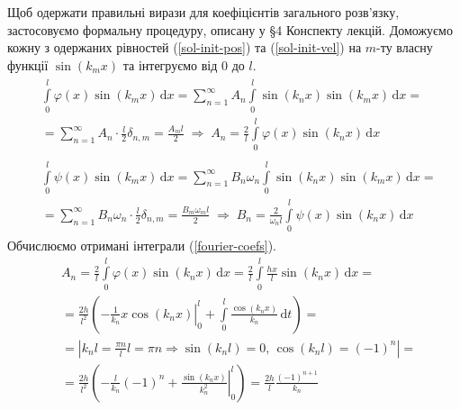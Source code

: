 Щоб одержати правильні вирази для коефіцієнтів загального розв'язку, застосовуємо формальну процедуру, описану у §4 Конспекту лекцій. Доможуємо кожну з одержаних рівностей (\ref{sol-init-pos}) та (\ref{sol-init-vel}) на $m$-ту власну функції $\sin(k_m x)$ та інтегруємо від $0$ до $l$. 
\begin{subequations} \label{fourier-coefs}
    \begin{gather}
        \begin{aligned}
            &\int\limits_0^l \varphi(x) \sin(k_m x) \,\mathrm{d}x = \sum^{\infty}_{n=1} A_n \int\limits_0^l \sin(k_n x) \sin(k_m x) \,\mathrm{d}x =\\
            &= \sum^{\infty}_{n=1} A_n \cdot \frac{l}{2} \delta_{n,m} = \frac{A_m l}{2}
            \;\Rightarrow\;
            A_n = \frac{2}{l} \int\limits_0^l \varphi(x) \sin(k_n x) \,\mathrm{d}x 
        \end{aligned}\\
        \begin{aligned}
            &\int\limits_0^l \psi(x) \sin(k_m x) \,\mathrm{d}x = \sum^{\infty}_{n=1} B_n\omega_n \int\limits_0^l \sin(k_n x) \sin(k_m x) \,\mathrm{d}x =\\
            &= \sum^{\infty}_{n=1} B_n\omega_n \cdot \frac{l}{2} \delta_{n,m} = \frac{B_m \omega_m l}{2}
            \;\Rightarrow\;
            B_n = \frac{2}{\omega_n l} \int\limits_0^l \psi(x) \sin(k_n x) \,\mathrm{d}x
        \end{aligned}
    \end{gather}
\end{subequations} 
Обчислюємо отримані інтеграли (\ref{fourier-coefs}).
\begin{equation*}
    \begin{aligned}
        &A_n = \frac{2}{l} \int\limits_0^l \varphi(x) \sin(k_n x) \,\mathrm{d}x = \frac{2}{l} \int\limits_0^l \frac{hx}{l} \sin(k_n x) \,\mathrm{d}x =\\
        &= \frac{2h}{l^2} \left(\left.-\frac{1}{k_n} x \cos(k_n x)\right|_0^l + \int\limits_0^l \frac{\cos(k_n x)}{k_n} \,\mathrm{d}t\right) =\\
        &= \left| k_n l = \frac{\pi n}{l} l = \pi n \Rightarrow \sin(k_n l) = 0,\, \cos(k_n l) = (-1)^n \right| =\\
        &= \frac{2h}{l^2} \left(-\frac{l}{k_n}(-1)^n + \left.\frac{\sin(k_n x)}{k_n^2}\right|_0^l \right) = \frac{2h}{l} \frac{(-1)^{n+1}}{k_n}
    \end{aligned}
\end{equation*}
